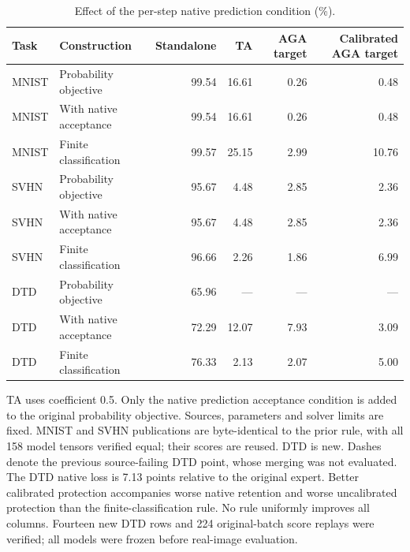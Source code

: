 \begin{table}[t]
\centering\small
\caption{Effect of the per-step native prediction condition (\%).}
\label{tab:native-acceptance-control}
\begin{tabular}{llrrrr}
\toprule
Task & Construction & Standalone & TA & AGA target & Calibrated AGA target \\
\midrule
MNIST & Probability objective & 99.54 & 16.61 & 0.26 & 0.48 \\
MNIST & With native acceptance & 99.54 & 16.61 & 0.26 & 0.48 \\
MNIST & Finite classification & 99.57 & 25.15 & 2.99 & 10.76 \\
SVHN & Probability objective & 95.67 & 4.48 & 2.85 & 2.36 \\
SVHN & With native acceptance & 95.67 & 4.48 & 2.85 & 2.36 \\
SVHN & Finite classification & 96.66 & 2.26 & 1.86 & 6.99 \\
DTD & Probability objective & 65.96 & --- & --- & --- \\
DTD & With native acceptance & 72.29 & 12.07 & 7.93 & 3.09 \\
DTD & Finite classification & 76.33 & 2.13 & 2.07 & 5.00 \\
\bottomrule
\end{tabular}
\par\smallskip
\begin{minipage}{\textwidth}\footnotesize
TA uses coefficient 0.5. Only the native prediction acceptance condition is added to the original probability objective. Sources, parameters and solver limits are fixed. MNIST and SVHN publications are byte-identical to the prior rule, with all 158 model tensors verified equal; their scores are reused. DTD is new. Dashes denote the previous source-failing DTD point, whose merging was not evaluated. The DTD native loss is 7.13 points relative to the original expert. Better calibrated protection accompanies worse native retention and worse uncalibrated protection than the finite-classification rule. No rule uniformly improves all columns. Fourteen new DTD rows and 224 original-batch score replays were verified; all models were frozen before real-image evaluation.
\end{minipage}
\end{table}
